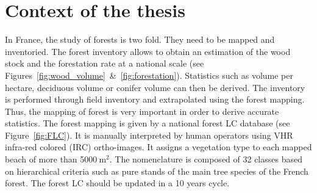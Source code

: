 \section{Context of the thesis}
In France, the study of forests is two fold. They need to be mapped and inventoried. The forest inventory allows to obtain an estimation of the wood stock and the forestation rate at a national scale (see Figures~\ref{fig:wood_volume}~\&~\ref{fig:forestation}). Statistics such as volume per hectare, deciduous volume or conifer volume can then be derived. The inventory is performed through field inventory and extrapolated using the forest mapping. Thus, the mapping of forest is very important in order to derive accurate statistics.	
The forest mapping is given by a national forest LC database (see Figure~\ref{fig:FLC}). It is manually interpreted by human operators using VHR infra-red colored (IRC) ortho-images. It assigns a vegetation type to each mapped beach of more than 5000$\:$m$^{2}$. The nomenclature is composed of 32 classes based on hierarchical criteria such as pure stands of the main tree species of the French forest. The forest LC should be updated in a 10 years cycle.

